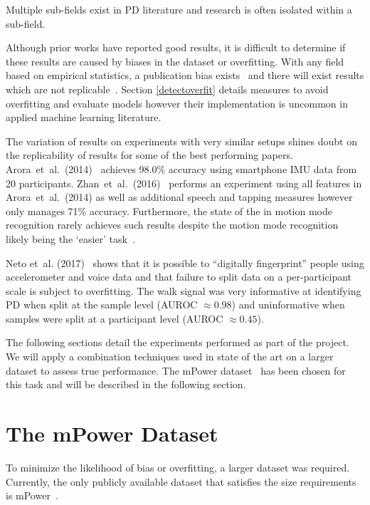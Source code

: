 \documentclass[12pt, twoside]{book}
\begin{document}
\begin{highlight}
Multiple sub-fields exist in PD literature and research is often isolated within a sub-field.
\end{highlight}

Although prior works have reported good results, it is difficult to determine if these results are caused by biases in the dataset or overfitting. With any field based on empirical statistics, a publication bias exists~\cite{publicationbias} and there will exist results which are not replicable~\cite{replicability}. Section \ref{detectoverfit} details measures to avoid overfitting and evaluate models however their implementation is uncommon in applied machine learning literature. 

The variation of results on experiments with very similar setups shines doubt on the replicability of results for some of the best performing papers. Arora~et~al.~(2014)~\cite{arora2014high} achieves 98.0\% accuracy using smartphone IMU data from 20 participants. Zhan~et~al.~(2016)~\cite{zhan2016high} performs an experiment using all features in Arora~et~al.~(2014) as well as additional speech and tapping measures however only manages 71\% accuracy. Furthermore, the state of the in motion mode recognition rarely achieves such results despite the motion mode recognition likely being the `easier' task~\cite{motionmoderecognition}. 

Neto et~al. (2017)~\cite{mpowerneto2017analysis} shows that it is possible to ``digitally fingerprint'' people using accelerometer and voice data and that failure to split data on a per-participant scale is subject to overfitting. The walk signal was very informative at identifying PD when split at the sample level (AUROC $\approx 0.98$) and uninformative when samples were split at a participant level (AUROC $\approx 0.45$). 
 
The following sections detail the experiments performed as part of the project. We will apply a combination techniques used in state of the art on a larger dataset to assess true performance. The mPower dataset~\cite{mpower} has been chosen for this  task and will be described in the following section.


\section{The mPower Dataset}
\label{mpower}
To minimize the likelihood of bias or overfitting, a larger dataset was required. Currently, the only publicly available dataset that satisfies the size requirements is mPower~\cite{mpower}. 
\end{document}
